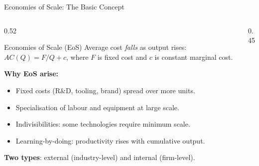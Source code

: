 \documentclass[aspectratio=169]{beamer}
\begin{document}
\begin{frame}{Economies of Scale: The Basic Concept}
\begin{columns}
\begin{column}{0.52\textwidth}
\begin{block}{Economies of Scale (EoS)}
  Average cost \emph{falls} as output rises: $AC(Q) = F/Q + c$, where $F$ is fixed cost and $c$ is constant marginal cost.
\end{block}
\vspace{0.3em}
\textbf{Why EoS arise:}
\begin{itemize}
  \item Fixed costs (R\&D, tooling, brand) spread over more units.
  \item Specialisation of labour and equipment at large scale.
  \item Indivisibilities: some technologies require minimum scale.
  \item Learning-by-doing: productivity rises with cumulative output.
\end{itemize}
\vspace{0.2em}
\textbf{Two types}: external (industry-level) and internal (firm-level).
\end{column}
\begin{column}{0.45\textwidth}
\end{column}
\end{columns}
\end{frame}
\end{document}
